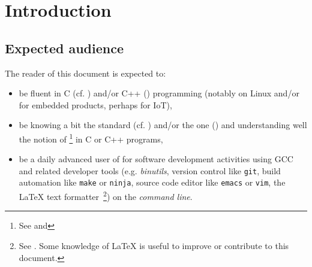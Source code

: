 \section{Introduction}


\subsection{Expected audience}

The reader of this document is expected to:
\begin{itemize}

  \item be fluent in C (cf. \cite{Kernighan:1988:CPL}) and/or C++
    (\cite{Stroustrup:2014:CplusPlus}) programming (notably on Linux
    and/or for embedded products, perhaps for IoT),

  \item be knowing a bit the  standard
    (cf. \cite{C11:std,Memarian:2016:PLDI}) and/or the
     one (\cite{CplusPlus11:std}) and
    understanding well the notion of  \footnote{See
      and } in C or C++
    programs,

  \item be a daily advanced user of  for software
    development activities using GCC and related developer tools
    (e.g. \textit{binutils}, version control like \texttt{git}, build
    automation like \texttt{make} or \texttt{ninja}, source code
    editor like \texttt{emacs} or \texttt{vim}, the {\LaTeX} text
    formatter~\footnote{See
      . Some knowledge of
            {\LaTeX} is useful to improve or contribute to this
            document.}) on the \emph{command line}.
    

\end{itemize}
